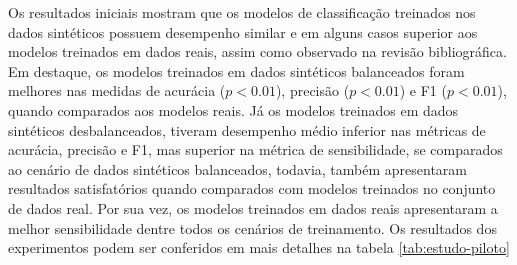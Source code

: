 Os resultados iniciais mostram que os modelos de classificação treinados nos dados sintéticos possuem desempenho similar e em alguns casos superior aos modelos treinados em dados reais, assim como observado na revisão bibliográfica. Em destaque, os modelos treinados em dados sintéticos balanceados foram melhores nas medidas de acurácia ($p < 0.01$), precisão ($p < 0.01$) e F1 ($p < 0.01$), quando comparados aos modelos reais.
Já os modelos treinados em dados sintéticos desbalanceados, tiveram desempenho médio inferior nas métricas de acurácia, precisão e F1, mas superior na métrica de sensibilidade, se comparados ao cenário de dados sintéticos balanceados, todavia, também apresentaram resultados satisfatórios quando comparados com modelos treinados no conjunto de dados real.
Por sua vez, os modelos treinados em dados reais apresentaram a melhor sensibilidade dentre todos os cenários de treinamento.
Os resultados dos experimentos podem ser conferidos em mais detalhes na tabela \ref{tab:estudo-piloto}

\begin{table}[htbp]
    \caption[Resultados dos experimentos realizados no estudo piloto]{Resultados dos experimentos realizados no estudo piloto: melhores resultados em cada métrica de avaliação destacados em negrito.}
\label{tab:estudo-piloto}
\end{table}

